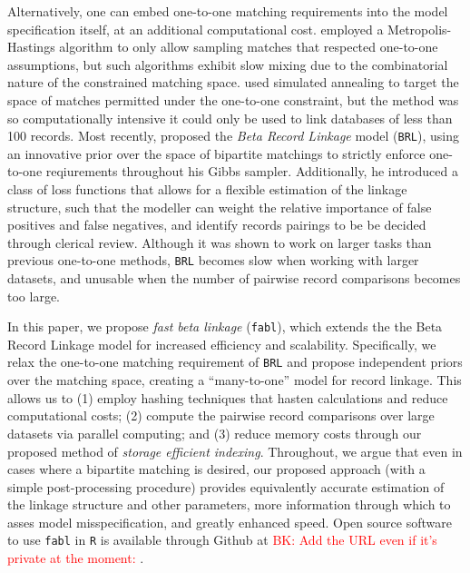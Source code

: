 \documentclass[12pt,letterpaper]{article}
\newcommand{\1}[1]{\mathbb{I}\!\left[#1\right]} %
\begin{document}
	Alternatively, one can embed one-to-one matching requirements into the model specification itself, at an additional computational cost. \cite{larsen2005} employed a Metropolis-Hastings algorithm to only allow sampling matches that respected one-to-one assumptions, but such algorithms exhibit slow mixing due to the combinatorial nature of the constrained matching space. \cite{fortunato_2010} used simulated annealing to target the space of matches permitted under the one-to-one constraint, but the method was so computationally intensive it could only be used to link databases of less than 100 records. Most recently, \cite{sadinle_bayesian_2017} proposed the \emph{Beta Record Linkage} model (\texttt{BRL}), using an innovative prior over the space of bipartite matchings to strictly enforce one-to-one reqiurements throughout his Gibbs sampler. Additionally, he introduced a class of loss functions that allows for a flexible estimation of the linkage structure, such that the modeller can weight the relative importance of false positives and false negatives, and identify records pairings to be be decided through clerical review. Although it was shown to work on larger tasks than previous one-to-one methods, \texttt{BRL} becomes slow when working with larger datasets, and unusable when the number of pairwise record comparisons becomes too large. 
	
	In this paper, we propose \emph{fast beta linkage} (\texttt{fabl}), which extends the the Beta Record Linkage model for increased efficiency and scalability. Specifically, we relax the one-to-one matching requirement of \texttt{BRL} and propose independent priors over the matching space, creating a ``many-to-one'' model for record linkage. This allows us to (1) employ hashing techniques that hasten calculations and reduce computational costs; (2) compute the pairwise record comparisons over large datasets via parallel computing; and (3) reduce memory costs through our proposed method of \emph{storage efficient indexing}. Throughout, we argue that even in cases where a bipartite matching is desired, our proposed approach (with a simple post-processing procedure) provides equivalently accurate estimation of the linkage structure and other parameters, more information through which to asses model misspecification, and greatly enhanced speed. Open source software to use \texttt{fabl} in \texttt{R} is available through Github at \textcolor{red}{BK: Add the URL even if it's private at the moment: \url{}}. 
	
\end{document}
